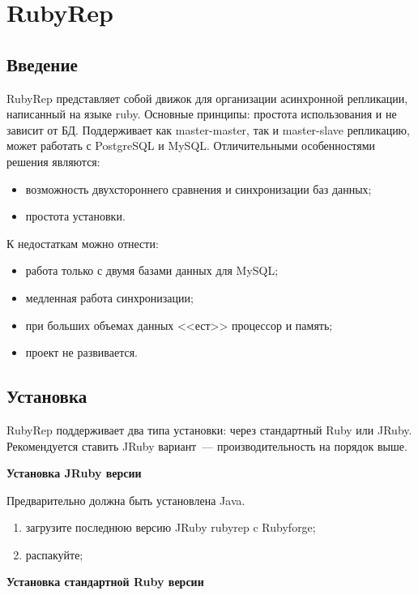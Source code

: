 \section{RubyRep}

\subsection{Введение}

RubyRep представляет собой движок для организации асинхронной репликации, написанный на языке ruby. Основные принципы: простота использования и не зависит от БД. Поддерживает как master-master, так и master-slave репликацию, может работать с PostgreSQL и MySQL. Отличительными особенностями решения являются:

\begin{itemize}
  \item возможность двухстороннего сравнения и синхронизации баз данных;
  \item простота установки.
\end{itemize}

К недостаткам можно отнести:

\begin{itemize}
  \item работа только с двумя базами данных для MySQL;
  \item медленная работа синхронизации;
  \item при больших объемах данных <<ест>> процессор и память;
  \item проект не развивается.
\end{itemize}


\subsection{Установка}

RubyRep поддерживает два типа установки: через стандартный Ruby или JRuby. Рекомендуется ставить JRuby вариант~--- производительность на порядок выше.

\textbf{Установка JRuby версии}

Предварительно должна быть установлена Java.

\begin{enumerate}
 \item загрузите последнюю версию JRuby rubyrep c Rubyforge;
 \item распакуйте;
\end{enumerate}

\textbf{Установка стандартной Ruby версии}

